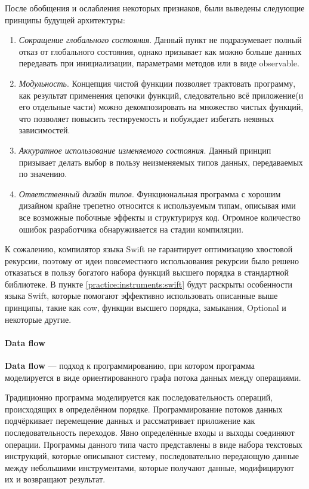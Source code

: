 После обобщения и ослабления некоторых признаков, были выведены следующие принципы будущей архитектуры:

\begin{enumerate}
\item \textit{Сокращение глобального состояния}. Данный пункт не подразумевает полный отказ от глобального состояния, однако призывает как можно больше данных передавать при инициализации, параметрами методов или в виде \gls{observable}.
\item \textit{Модульность}. Концепция чистой функции позволяет трактовать программу, как результат применения цепочки функций, следовательно всё приложение(и его отдельные части) можно декомпозировать на множество чистых функций, что позволяет повысить тестируемость и побуждает избегать неявных зависимостей.
\item \textit {Аккуратное использование изменяемого состояния}. Данный принцип призывает делать выбор в пользу неизменяемых типов данных, передаваемых по значению. 
\item \textit {Ответственный дизайн типов}. Функциональная программа с хорошим дизайном крайне трепетно относится к используемым типам, описывая ими все возможные побочные эффекты и структурируя код. Огромное количество ошибок разработчика обнаруживается на стадии компиляции.
\end{enumerate}

К сожалению, компилятор языка Swift не гарантирует оптимизацию хвостовой рекурсии, поэтому от идеи повсеместного использования рекурсии было решено отказаться в пользу богатого набора функций высшего порядка в стандартной библиотеке. В пункте \ref{practice:instruments:swift} будут раскрыты особенности языка Swift, которые помогают эффективно использовать описанные выше принципы, такие как \gls{cow}, функции высшего порядка, замыкания, Optional и некоторые другие.

\paragraph{Data flow}
\textbf{Data flow} --- подход к программированию, при котором программа моделируется в виде ориентированного графа потока данных между операциями. \cite{wiki:data-flow} 

Традиционно программа моделируется как последовательность операций, происходящих в определённом порядке. Программирование потоков данных подчёркивает перемещение данных и рассматривает приложение как последовательность переходов. Явно определённые входы и выходы соединяют операции. Программы данного типа часто представлены в виде набора текстовых инструкций, которые описывают систему, последовательно передающую данные между небольшими инструментами, которые получают данные, модифицируют их и возвращают результат. 

